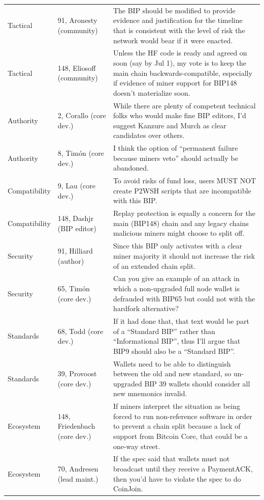 \documentclass[sigconf,screen]{acmart}
\begin{document}
\begin{table}[t]
\begin{tabular}{p{}p{}p{}}
Tactical & 91, Aronesty (community) & The BIP should be modified to provide evidence and justification for the timeline that is consistent with the level of risk the network would bear if it were enacted. \\
Tactical & 148, Eliosoff (community) & Unless the HF code is ready and agreed on soon (say by Jul 1), my vote is to keep the main chain backwards-compatible, especially if evidence of miner support for BIP148 doesn't materialize soon. \\
Authority & 2, Corallo (core dev.) & While there are plenty of competent technical folks who would make fine BIP editors, I'd suggest Kanzure and Murch as clear candidates over others. \\
Authority & 8, Tim\'on (core dev.) & I think the option of ``permanent failure because miners veto'' should actually be abandoned. \\
Compatibility & 9, Lau (core dev.) & To avoid risks of fund loss, users MUST NOT create P2WSH scripts that are incompatible with this BIP. \\
Compatibility & 148, Dashjr (BIP editor) & Replay protection is equally a concern for the main (BIP148) chain and any legacy chains malicious miners might choose to split off. \\
Security & 91, Hilliard (author) & Since this BIP only activates with a clear miner majority it should not increase the risk of an extended chain split. \\
Security & 65, Tim\'on (core dev.) & Can you give an example of an attack in which a non-upgraded full node wallet is defrauded with BIP65 but could not with the hardfork alternative? \\
Standards & 68, Todd (core dev.) & If it had done that, that text would be part of a ``Standard BIP'' rather than ``Informational BIP'', thus I'll argue that BIP9 should also be a ``Standard BIP''. \\
Standards & 39, Provoost (core dev.) & Wallets need to be able to distinguish between the old and new standard, so un-upgraded BIP 39 wallets should consider all new mnemonics invalid. \\
Ecosystem & 148, Friedenbach (core dev.) & If miners interpret the situation as being forced to run non-reference software in order to prevent a chain split because a lack of support from Bitcoin Core, that could be a one-way street. \\
Ecosystem & 70, Andresen (lead maint.) & If the spec said that wallets must not broadcast until they receive a PaymentACK, then you'd have to violate the spec to do CoinJoin. \\

\end{tabular}
\end{table}
\end{document}
